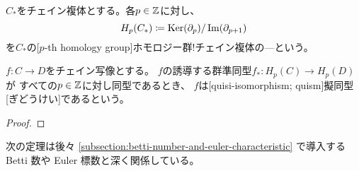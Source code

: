 \documentclass[report]{jlreq}
\begin{document}
\begin{definition}[ホモロジー群]
    $C_*$をチェイン複体とする。各$p \in \mathbb{Z}$に対し、
    \begin{equation}
        H_p(C_*) \coloneqq \operatorname{\mathrm{Ker}}(\partial_{p}) / \operatorname{\mathrm{Im}}(\partial_{p+1})
    \end{equation}
    を$C_*$の[$p$-th homology group]{ホモロジー群!チェイン複体の---}という。
\end{definition}

\begin{definition}[チェイン写像から誘導される群準同型]
\end{definition}

\begin{definition}[擬同型]
    $f \colon C \to D$をチェイン写像とする。
    $f$の誘導する群準同型$f_* \colon H_p(C) \to H_p(D)$が
    すべての$p \in \mathbb{Z}$に対し同型であるとき、
    $f$は[quisi-isomorphism; quism]{擬同型}[ぎどうけい]であるという。
\end{definition}

\begin{theorem}[チェインホモトピーと誘導される群準同型]
    \TODO{}
\end{theorem}

\begin{proof}
    \TODO{}
\end{proof}

次の定理は後々
\cref{subsection:betti-number-and-euler-characteristic}
で導入する Betti 数や Euler 標数と深く関係している。

\end{document}
